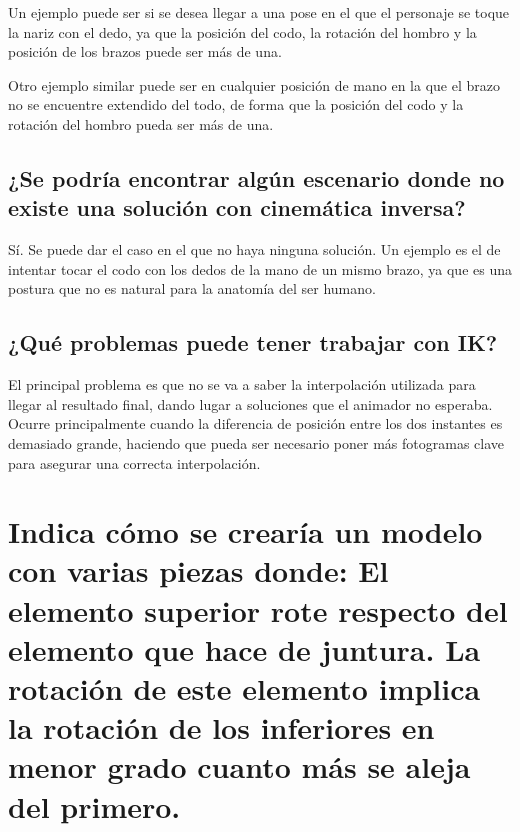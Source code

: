 \documentclass{article}
\begin{document}
Un ejemplo puede ser si se desea llegar a una pose en el que el personaje se toque la nariz con el dedo, ya que la posición del codo, la rotación del hombro y la posición de los brazos puede ser más de una.

Otro ejemplo similar puede ser en cualquier posición de mano en la que el brazo no se encuentre extendido del todo, de forma que la posición del codo y la rotación del hombro pueda ser más de una.

\subsection{¿Se podría encontrar algún escenario donde no existe una solución con cinemática inversa?}

Sí. Se puede dar el caso en el que no haya ninguna solución. Un ejemplo es el de intentar tocar el codo con los dedos de la mano de un mismo brazo, ya que es una postura que no es natural para la anatomía del ser humano.

\subsection{¿Qué problemas puede tener trabajar con IK?}

El principal problema es que no se va a saber la interpolación utilizada para llegar al resultado final, dando lugar a soluciones que el animador no esperaba. Ocurre principalmente cuando la diferencia de posición entre los dos instantes es demasiado grande, haciendo que pueda ser necesario poner más fotogramas clave para asegurar una correcta interpolación.

\section{Indica cómo se crearía un modelo con varias piezas donde: El elemento superior rote respecto del elemento que hace de juntura. La rotación de este elemento implica la rotación de los inferiores en menor grado cuanto más se aleja del primero.}
\end{document}
